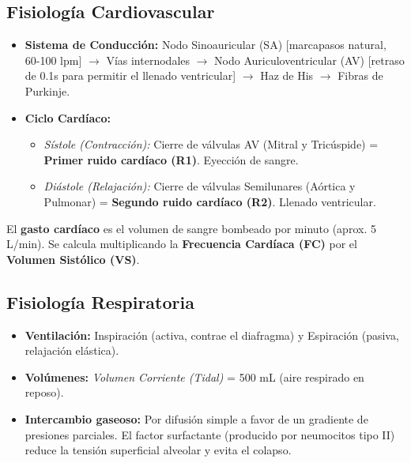 \documentclass[spanish,letterpaper,oneside]{article}
\begin{document}
\subsection{Fisiología Cardiovascular}
\begin{itemize}
    \item \textbf{Sistema de Conducción:} Nodo Sinoauricular (SA) [marcapasos natural, 60-100 lpm] $\rightarrow$ Vías internodales $\rightarrow$ Nodo Auriculoventricular (AV) [retraso de 0.1s para permitir el llenado ventricular] $\rightarrow$ Haz de His $\rightarrow$ Fibras de Purkinje.
    \item \textbf{Ciclo Cardíaco:} 
    \begin{itemize}
        \item \textit{Sístole (Contracción):} Cierre de válvulas AV (Mitral y Tricúspide) = \textbf{Primer ruido cardíaco (R1)}. Eyección de sangre.
        \item \textit{Diástole (Relajación):} Cierre de válvulas Semilunares (Aórtica y Pulmonar) = \textbf{Segundo ruido cardíaco (R2)}. Llenado ventricular.
    \end{itemize}
\end{itemize}
\begin{tcolorbox}[colback=blue!5!white,colframe=blue!75!black,title=Dato EXANI-II]
El \textbf{gasto cardíaco} es el volumen de sangre bombeado por minuto (aprox. 5 L/min). Se calcula multiplicando la \textbf{Frecuencia Cardíaca (FC)} por el \textbf{Volumen Sistólico (VS)}.
\end{tcolorbox}

\subsection{Fisiología Respiratoria}
\begin{itemize}
    \item \textbf{Ventilación:} Inspiración (activa, contrae el diafragma) y Espiración (pasiva, relajación elástica).
    \item \textbf{Volúmenes:} \textit{Volumen Corriente (Tidal)} = 500 mL (aire respirado en reposo).
    \item \textbf{Intercambio gaseoso:} Por difusión simple a favor de un gradiente de presiones parciales. El factor surfactante (producido por neumocitos tipo II) reduce la tensión superficial alveolar y evita el colapso.
\end{itemize}
\end{document}
